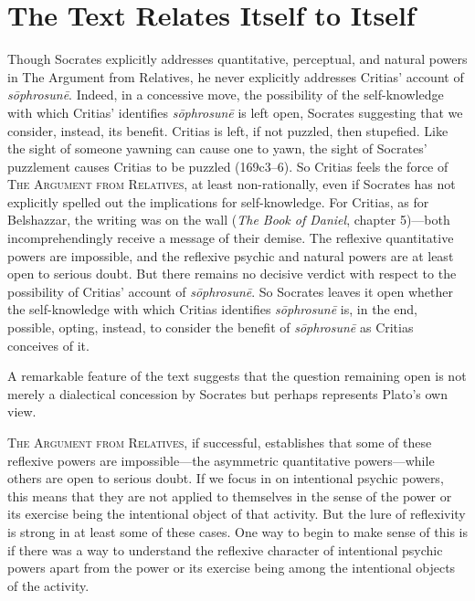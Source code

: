 

\section{The Text Relates Itself to Itself} %
\label{sec:the_text_relates_itself_to_itself}

Though Socrates explicitly addresses quantitative, perceptual, and natural powers in The Argument from Relatives, he never explicitly addresses Critias' account of \emph{sōphrosunē}. Indeed, in a concessive move, the possibility of the self-knowledge with which Critias' identifies \emph{sōphrosunē} is left open, Socrates suggesting that we consider, instead, its benefit. Critias is left, if not puzzled, then stupefied. Like the sight of someone yawning can cause one to yawn, the sight of Socrates' puzzlement causes Critias to be puzzled (169c3–6). So Critias feels the force of \textsc{The Argument from Relatives}, at least non-rationally, even if Socrates has not explicitly spelled out the implications for self-knowledge. For Critias, as for Belshazzar, the writing was on the wall (\emph{The Book of Daniel}, chapter 5)—both incomprehendingly receive a message of their demise. The reflexive quantitative powers are impossible, and the reflexive psychic and natural powers are at least open to serious doubt. But there remains no decisive verdict with respect to the possibility of Critias' account of \emph{sōphrosunē}. So Socrates leaves it open whether the self-knowledge with which Critias identifies \emph{sōphrosunē} is, in the end, possible, opting, instead, to consider the benefit of \emph{sōphrosunē} as Critias conceives of it.

A remarkable feature of the text suggests that the question remaining open is not merely a dialectical concession by Socrates but perhaps represents Plato's own view. 

\textsc{The Argument from Relatives}, if successful, establishes that some of these reflexive powers are impossible—the asymmetric quantitative powers—while others are open to serious doubt. If we focus in on intentional psychic powers, this means that they are not applied to themselves in the sense of the power or its exercise being the intentional object of that activity. But the lure of reflexivity is strong in at least some of these cases. One way to begin to make sense of this is if there was a way to understand the reflexive character of intentional psychic powers apart from the power or its exercise being among the intentional objects of the activity.


